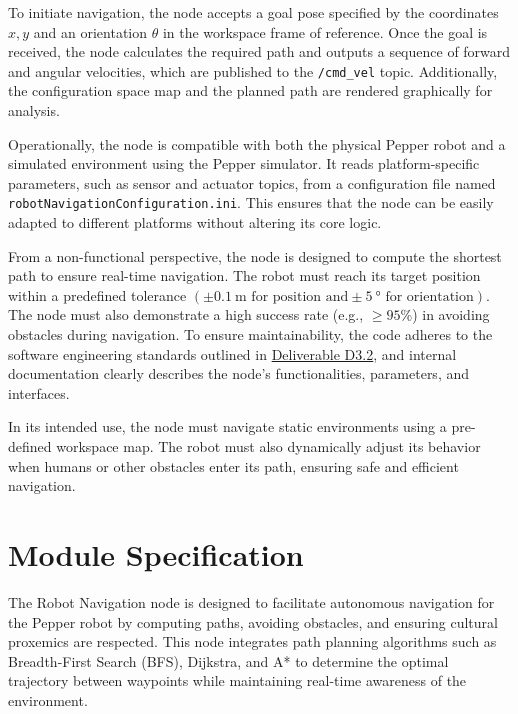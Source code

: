 \documentclass{CSSRforAfrica}
\begin{document}
\noindent To initiate navigation, the node accepts a goal pose specified by the coordinates $x, y$ and an orientation $\theta$ in the workspace frame of reference. Once the goal is received, the node calculates the required path and outputs a sequence of forward and angular velocities, which are published to the \texttt{/cmd\_vel} topic. Additionally, the configuration space map and the planned path are rendered graphically for analysis.

\noindent Operationally, the node is compatible with both the physical Pepper robot and a simulated environment using the Pepper simulator. It reads platform-specific parameters, such as sensor and actuator topics, from a configuration file named \verb|robotNavigationConfiguration.ini|. This ensures that the node can be easily adapted to different platforms without altering its core logic.

\noindent From a non-functional perspective, the node is designed to compute the shortest path to ensure real-time navigation. The robot must reach its target position within a predefined tolerance $(\pm \SI{0.1}{\meter} \text{ for position and} \pm \SI{5}{\degree}\text{ for orientation})$. The node must also demonstrate a high success rate (e.g., $\geq{95}$\%) in avoiding obstacles during navigation. To ensure maintainability, the code adheres to the software engineering standards outlined in \href{https://cssr4africa.github.io/deliverables/CSSR4Africa_Deliverable_D3.2.pdf}{Deliverable D3.2}, and internal documentation clearly describes the node’s functionalities, parameters, and interfaces.

\noindent In its intended use, the node must navigate static environments using a pre-defined workspace map. The robot must also dynamically adjust its behavior when humans or other obstacles enter its path, ensuring safe and efficient navigation.


\newpage

\section{Module Specification}
The Robot Navigation node is designed to facilitate autonomous navigation for the Pepper robot by computing paths, avoiding obstacles, and ensuring cultural proxemics are respected. This node integrates path planning algorithms such as Breadth-First Search (BFS), Dijkstra, and A* to determine the optimal trajectory between waypoints while maintaining real-time awareness of the environment.
\end{document}
